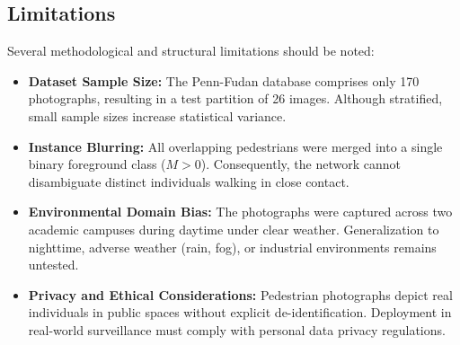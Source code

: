 \documentclass[10pt,a4paper]{article}
\begin{document}
\subsection{Limitations}
Several methodological and structural limitations should be noted:
\begin{itemize}
    \item \textbf{Dataset Sample Size:} The Penn-Fudan database comprises only 170 photographs, resulting in a test partition of 26 images. Although stratified, small sample sizes increase statistical variance.
    \item \textbf{Instance Blurring:} All overlapping pedestrians were merged into a single binary foreground class ($M > 0$). Consequently, the network cannot disambiguate distinct individuals walking in close contact.
    \item \textbf{Environmental Domain Bias:} The photographs were captured across two academic campuses during daytime under clear weather. Generalization to nighttime, adverse weather (rain, fog), or industrial environments remains untested.
    \item \textbf{Privacy and Ethical Considerations:} Pedestrian photographs depict real individuals in public spaces without explicit de-identification. Deployment in real-world surveillance must comply with personal data privacy regulations.
\end{itemize}
\end{document}
